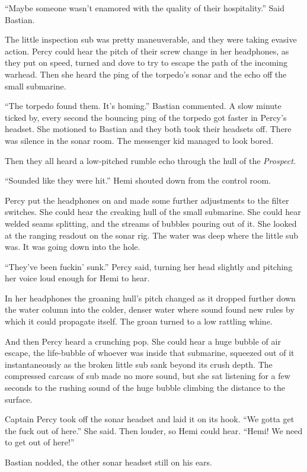 \documentclass[]{scrbook}
\begin{document}
``Maybe someone wasn't enamored with the quality of their hospitality.''
Said Bastian.

The little inspection sub was pretty maneuverable, and they were taking
evasive action. Percy could hear the pitch of their screw change in her
headphones, as they put on speed, turned and dove to try to escape the
path of the incoming warhead. Then she heard the ping of the torpedo's
sonar and the echo off the small submarine.

``The torpedo found them. It's homing.'' Bastian commented. A slow
minute ticked by, every second the bouncing ping of the torpedo got
faster in Percy's headset. She motioned to Bastian and they both took
their headsets off. There was silence in the sonar room. The messenger
kid managed to look bored.

Then they all heard a low-pitched rumble echo through the hull of the
\emph{Prospect}.

``Sounded like they were hit.'' Hemi shouted down from the control room.

Percy put the headphones on and made some further adjustments to the
filter switches. She could hear the creaking hull of the small
submarine. She could hear welded seams splitting, and the streams of
bubbles pouring out of it. She looked at the ranging readout on the
sonar rig. The water was deep where the little sub was. It was going
down into the hole.

``They've been fuckin' sunk.'' Percy said, turning her head slightly and
pitching her voice loud enough for Hemi to hear.

In her headphones the groaning hull's pitch changed as it dropped
further down the water column into the colder, denser water where sound
found new rules by which it could propagate itself. The groan turned to
a low rattling whine.

And then Percy heard a crunching pop. She could hear a huge bubble of
air escape, the life-bubble of whoever was inside that submarine,
squeezed out of it instantaneously as the broken little sub sank beyond
its crush depth. The compressed carcass of sub made no more sound, but
she sat listening for a few seconds to the rushing sound of the huge
bubble climbing the distance to the surface.

Captain Percy took off the sonar headset and laid it on its hook. ``We
gotta get the fuck out of here.'' She said. Then louder, so Hemi could
hear. ``Hemi! We need to get out of here!''

Bastian nodded, the other sonar headset still on his ears.
\end{document}
